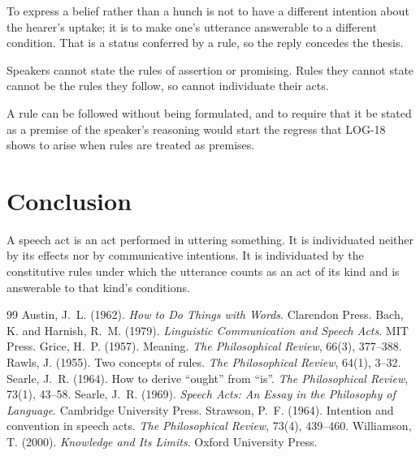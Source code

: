 \documentclass{situationist-preprint}
\begin{document}
\begin{reply}
To express a belief rather than a hunch is not to have a different intention about the hearer's uptake; it is to make one's utterance answerable to a different condition. That is a status conferred by a rule, so the reply concedes the thesis.
\end{reply}

\begin{objection}\label{o:regress}
Speakers cannot state the rules of assertion or promising. Rules they cannot state cannot be the rules they follow, so cannot individuate their acts.
\end{objection}

\begin{reply}
A rule can be followed without being formulated, and to require that it be stated as a premise of the speaker's reasoning would start the regress that LOG-18 shows to arise when rules are treated as premises.
\end{reply}

\section{Conclusion}

A speech act is an act performed in uttering something. It is individuated neither by its effects nor by communicative intentions. It is individuated by the constitutive rules under which the utterance counts as an act of its kind and is answerable to that kind's conditions.

\begin{thebibliography}{99}\small
{} Austin, J.~L. (1962). \emph{How to Do Things with Words}. Clarendon Press.
 Bach, K. and Harnish, R.~M. (1979). \emph{Linguistic Communication and Speech Acts}. MIT Press.
 Grice, H.~P. (1957). Meaning. \emph{The Philosophical Review}, 66(3), 377--388.
 Rawls, J. (1955). Two concepts of rules. \emph{The Philosophical Review}, 64(1), 3--32.
 Searle, J.~R. (1964). How to derive \enquote{ought} from \enquote{is}. \emph{The Philosophical Review}, 73(1), 43--58.
 Searle, J.~R. (1969). \emph{Speech Acts: An Essay in the Philosophy of Language}. Cambridge University Press.
 Strawson, P.~F. (1964). Intention and convention in speech acts. \emph{The Philosophical Review}, 73(4), 439--460.
 Williamson, T. (2000). \emph{Knowledge and Its Limits}. Oxford University Press.
\end{thebibliography}
\end{document}
